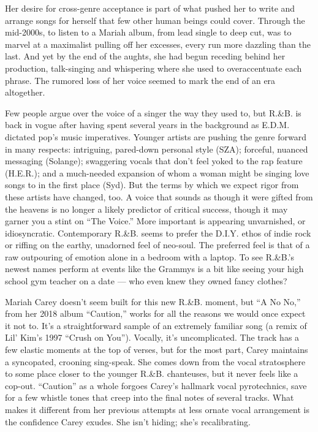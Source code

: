 Her desire for cross-genre acceptance is part of what pushed her to
write and arrange songs for herself that few other human beings could
cover. Through the mid-2000s, to listen to a Mariah album, from lead
single to deep cut, was to marvel at a maximalist pulling off her
excesses, every run more dazzling than the last. And yet by the end of
the aughts, she had begun receding behind her production, talk-singing
and whispering where she used to overaccentuate each phrase. The rumored
loss of her voice seemed to mark the end of an era altogether.

Few people argue over the voice of a singer the way they used to, but
R.\&B. is back in vogue after having spent several years in the
background as E.D.M. dictated pop's music imperatives. Younger artists
are pushing the genre forward in many respects: intriguing, pared-down
personal style (SZA); forceful, nuanced messaging (Solange); swaggering
vocals that don't feel yoked to the rap feature (H.E.R.); and a
much-needed expansion of whom a woman might be singing love songs to in
the first place (Syd). But the terms by which we expect rigor from these
artists have changed, too. A voice that sounds as though it were gifted
from the heavens is no longer a likely predictor of critical success,
though it may garner you a stint on ``The Voice.'' More important is
appearing unvarnished, or idiosyncratic. Contemporary R.\&B. seems to
prefer the D.I.Y. ethos of indie rock or riffing on the earthy,
unadorned feel of neo-soul. The preferred feel is that of a raw
outpouring of emotion alone in a bedroom with a laptop. To see R.\&B.'s
newest names perform at events like the Grammys is a bit like seeing
your high school gym teacher on a date --- who even knew they owned
fancy clothes?

Mariah Carey doesn't seem built for this new R.\&B. moment, but ``A No
No,'' from her 2018 album ``Caution,'' works for all the reasons we
would once expect it not to. It's a straightforward sample of an
extremely familiar song (a remix of Lil' Kim's 1997 ``Crush on You'').
Vocally, it's uncomplicated. The track has a few elastic moments at the
top of verses, but for the most part, Carey maintains a syncopated,
crooning sing-speak. She comes down from the vocal stratosphere to some
place closer to the younger R.\&B. chanteuses, but it never feels like a
cop-out. ``Caution'' as a whole forgoes Carey's hallmark vocal
pyrotechnics, save for a few whistle tones that creep into the final
notes of several tracks. What makes it different from her previous
attempts at less ornate vocal arrangement is the confidence Carey
exudes. She isn't hiding; she's recalibrating.

